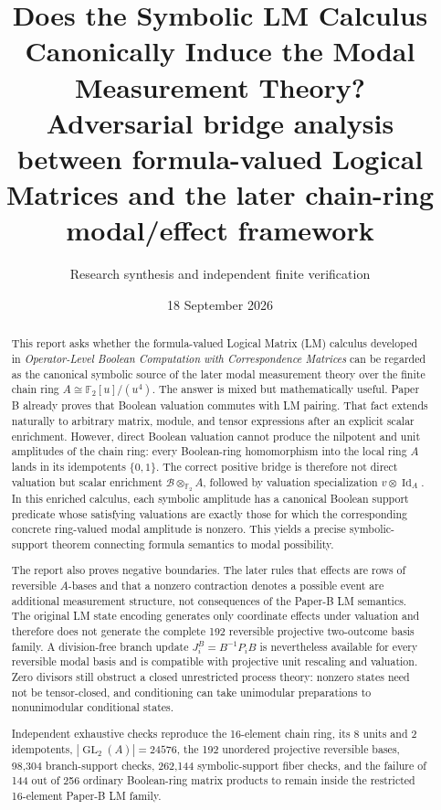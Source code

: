 \documentclass[11pt]{article}
\title{\textbf{Does the Symbolic LM Calculus Canonically Induce the Modal Measurement Theory?}\\
\large Adversarial bridge analysis between formula-valued Logical Matrices and the later chain-ring modal/effect framework}
\author{Research synthesis and independent finite verification}
\date{18 September 2026}
\theoremstyle{definition}
\newcommand{\F}{\mathbb{F}}
\newcommand{\B}{\mathcal{B}}
\newcommand{\GL}{\operatorname{GL}}
\newcommand{\Id}{\operatorname{Id}}
\begin{document}
\maketitle

\begin{abstract}
This report asks whether the formula-valued Logical Matrix (LM) calculus developed in
\emph{Operator-Level Boolean Computation with Correspondence Matrices} can be regarded as the
canonical symbolic source of the later modal measurement theory over the finite chain ring
\(A\cong \F_2[u]/(u^4)\). The answer is mixed but mathematically useful. Paper B already proves
that Boolean valuation commutes with LM pairing. That fact extends naturally to arbitrary matrix,
module, and tensor expressions after an explicit scalar enrichment. However, direct Boolean
valuation cannot produce the nilpotent and unit amplitudes of the chain ring: every Boolean-ring
homomorphism into the local ring \(A\) lands in its idempotents \(\{0,1\}\). The correct positive
bridge is therefore not direct valuation but scalar enrichment
\(\B\otimes_{\F_2} A\), followed by valuation specialization
\(v\otimes \Id_A\). In this enriched calculus, each symbolic amplitude has a canonical Boolean
support predicate whose satisfying valuations are exactly those for which the corresponding concrete
ring-valued modal amplitude is nonzero. This yields a precise symbolic-support theorem connecting
formula semantics to modal possibility.

The report also proves negative boundaries. The later rules that effects are rows of reversible
\(A\)-bases and that a nonzero contraction denotes a possible event are additional measurement
structure, not consequences of the Paper-B LM semantics. The original LM state encoding generates
only coordinate effects under valuation and therefore does not generate the complete 192 reversible
projective two-outcome basis family. A division-free branch update
\(J_i^B=B^{-1}P_iB\) is nevertheless available for every reversible modal basis and is compatible
with projective unit rescaling and valuation. Zero divisors still obstruct a closed unrestricted
process theory: nonzero states need not be tensor-closed, and conditioning can take unimodular
preparations to nonunimodular conditional states.

Independent exhaustive checks reproduce the 16-element chain ring, its 8 units and 2 idempotents,
\(|\GL_2(A)|=24576\), the 192 unordered projective reversible bases, 98,304 branch-support checks,
262,144 symbolic-support fiber checks, and the failure of 144 out of 256 ordinary Boolean-ring
matrix products to remain inside the restricted 16-element Paper-B LM family.
\end{abstract}
\end{document}

